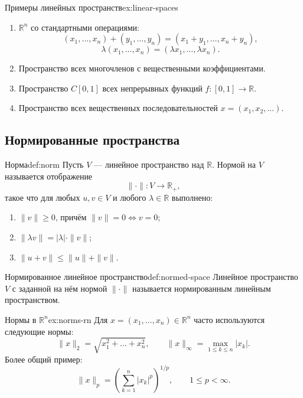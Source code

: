 \begin{Example}{Примеры линейных пространств}{ex:linear-spaces}
	\begin{enumerate}
		\item \(\mathbb R^n\) со стандартными операциями:
		\[
		(x_1,\dots,x_n)+(y_1,\dots,y_n)
		=
		(x_1+y_1,\dots,x_n+y_n),
		\]
		\[
		\lambda(x_1,\dots,x_n)
		=
		(\lambda x_1,\dots,\lambda x_n).
		\]
		
		\item Пространство всех многочленов с вещественными коэффициентами.
		
		\item Пространство \(C[0,1]\) всех непрерывных функций \(f:[0,1]\to\mathbb R\).
		
		\item Пространство всех вещественных последовательностей \(x=(x_1,x_2,\dots)\).
	\end{enumerate}
\end{Example}

\subsection{Нормированные пространства}

\begin{Definition}{Норма}{def:norm}
	Пусть \(V\) — линейное пространство над \(\mathbb R\). Нормой на \(V\) называется отображение
	\[
	\|\cdot\|:V\to\mathbb R_+,
	\]
	такое что для любых \(u,v\in V\) и любого \(\lambda\in\mathbb R\) выполнено:
	
	\begin{enumerate}
		\item \(\|v\|\ge 0\), причём \(\|v\|=0\iff v=0\);
		\item \(\|\lambda v\|=|\lambda|\cdot \|v\|\);
		\item \(\|u+v\|\le \|u\|+\|v\|\).
	\end{enumerate}
\end{Definition}

\begin{Definition}{Нормированное линейное пространство}{def:normed-space}
	Линейное пространство \(V\) с заданной на нём нормой \(\|\cdot\|\) называется нормированным линейным пространством.
\end{Definition}

\begin{Example}{Нормы в \(\mathbb R^n\)}{ex:norms-rn}
	Для \(x=(x_1,\dots,x_n)\in\mathbb R^n\) часто используются следующие нормы:
	\[
	\|x\|_2=\sqrt{x_1^2+\dots+x_n^2},
	\qquad
	\|x\|_{\infty}=\max_{1\le k\le n}|x_k|.
	\]
	Более общий пример:
	\[
	\|x\|_p=
	\left(\sum_{k=1}^{n}|x_k|^p\right)^{1/p},
	\qquad
	1\le p<\infty.
	\]
\end{Example}

